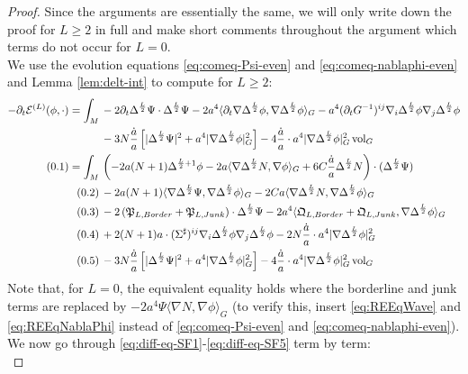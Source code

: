 \documentclass[11pt,leqno,textwidth=10cm]{amsart}
\numberwithin{equation}{section}
\theoremstyle{definition}
\theoremstyle{plain}
\newcommand{\1}{\mathbbm{1}}
\newcommand{\E}{\mathcal{E}}
\newcommand{\vol}[1]{{\text{\normalfont{vol}}}_{#1}}
\newcommand{\del}{\partial}
\newcommand{\Lap}{\Delta}
\newcommand{\numberthis}{\addtocounter{equation}{1}\tag{\theequation}}
\renewcommand{\theequation}{\arabic{section}.\arabic{equation}}
\begin{document}
\begin{proof}
Since the arguments are essentially the same, we will only write down the proof for $L\geq 2$ in full and make short comments throughout the argument which terms do not occur for $L=0$.\\
We use the evolution equations \eqref{eq:comeq-Psi-even} and \eqref{eq:comeq-nablaphi-even} and Lemma \ref{lem:delt-int} to compute for $L\geq 2$:
\begin{subequations}
\begin{align*}
-\del_t\E^{(L)}(\phi,\cdot)=\int_M&\,-2\del_t\Lap^{\frac{L}2}\Psi\cdot\Lap^{\frac{L}2}\Psi-2a^4\langle\del_t\nabla\Lap^{\frac{L}2}\phi,\nabla\Lap^{\frac{L}2}\phi\rangle_G-a^4(\del_tG^{-1})^{ij}\nabla_i\Lap^{\frac{L}2}\phi\nabla_j\Lap^{\frac{L}2}\phi\\
&\,-3N\frac{\dot{a}}a\left[\lvert\Lap^{\frac{L}2}\Psi\rvert^2+a^4\lvert\nabla\Lap^\frac{L}2\phi\rvert_G^2\right]-4\frac{\dot{a}}a\cdot a^4\lvert\nabla\Lap^\frac{L}2\phi\rvert_G^2\,\vol{G}\\
\numberthis\label{eq:diff-eq-SF1}=\int_M&\, \left(-2a(N+1)\Lap^{\frac{L}2+1}\phi-2a\langle\nabla\Lap^{\frac{L}2}N,\nabla\phi\rangle_G+6C\frac{\dot{a}}a\Lap^{\frac{L}2}N\right)\cdot(\Lap^{\frac{L}2}\Psi)\\
\numberthis\label{eq:diff-eq-SF2}&\,-2a(N+1)\langle\nabla\Lap^{\frac{L}2}\Psi,\nabla\Lap^{\frac{L}2}\phi\rangle_G-2Ca\langle\nabla\Lap^{\frac{L}2}N,\nabla\Lap^{\frac{L}2}\phi\rangle_G\\
\numberthis\label{eq:diff-eq-SF3}&\,-2\left(\mathfrak{P}_{L,Border}+\mathfrak{P}_{L,Junk}\right)\cdot\Lap^{\frac{L}2}\Psi-2a^4\langle\mathfrak{Q}_{L,Border}+\mathfrak{Q}_{L,Junk},\nabla\Lap^{\frac{L}2}\phi\rangle_G\\
\numberthis\label{eq:diff-eq-SF4}&\,+2(N+1)a\cdot(\Sigma^\sharp)^{ij}\nabla_i\Lap^{\frac{L}2}\phi\nabla_j\Lap^{\frac{L}2}\phi-2N\frac{\dot{a}}a\cdot a^4\lvert\nabla\Lap^{\frac{L}2}\phi\rvert_G^2\\
\numberthis\label{eq:diff-eq-SF5}&\,-3N\frac{\dot{a}}a\left[\lvert\Lap^{\frac{L}2}\Psi\rvert^2+a^4\lvert\nabla\Lap^\frac{L}2\phi\rvert_G^2\right]-4\frac{\dot{a}}a\cdot a^4\lvert\nabla\Lap^\frac{L}2\phi\rvert_G^2\,\vol{G} \\
\end{align*}
\end{subequations}
Note that, for $L=0$, the equivalent equality holds where the borderline and junk terms are replaced by $-2a^4\Psi\langle\nabla N,\nabla\phi\rangle_G$ (to verify this, insert \eqref{eq:REEqWave} and \eqref{eq:REEqNablaPhi} instead of \eqref{eq:comeq-Psi-even} and \eqref{eq:comeq-nablaphi-even}). We now go through \eqref{eq:diff-eq-SF1}-\eqref{eq:diff-eq-SF5} term by term:\\

\end{proof}
\end{document}
